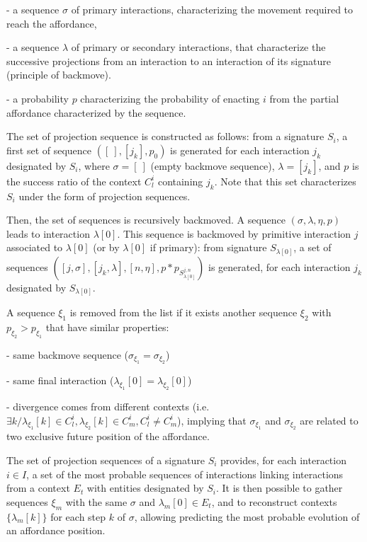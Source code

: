 \documentclass[conference]{IEEEtran}
\begin{document}
- a sequence $\sigma$ of primary interactions, characterizing the movement required to reach the affordance,

- a sequence $\lambda$ of primary or secondary interactions, that characterize the successive projections from an interaction to an interaction of its signature (principle of backmove).

- a probability $p$ characterizing the probability of enacting $i$ from the partial affordance characterized by the sequence.


The set of projection sequence is constructed as follows: from a signature $S_i$, a first set of sequence $([\:], [j_k], p_0)$ is generated for each interaction $j_k$ designated by $S_i$, where $\sigma=[\: ]$ (empty backmove sequence), $\lambda=[j_k]$,
and $p$ is the success ratio of the context $C_l^i$ containing $j_k$. Note that this set characterizes $S_i$ under the form of projection sequences.

Then, the set of sequences is recursively backmoved. A sequence $(\sigma, \lambda, \eta, p)$ leads to interaction $\lambda[0]$. This sequence is backmoved by primitive interaction $j$ associated to $\lambda[0]$ (or by $\lambda[0]$ if primary): from signature $S_{\lambda[0]}$, a set of sequences $([j,\sigma], [j_k,\lambda], [n,\eta], p*p_{S_{\lambda[0]}^{j,n}})$ is generated, for each interaction $j_k$ designated by $S_{\lambda[0]}$.

A sequence $\xi_1$ is removed from the list if it exists another sequence $\xi_2$ with $p_{\xi_2}>p_{\xi_1}$ that have similar properties:

- same backmove sequence ($\sigma_{\xi_1}=\sigma_{\xi_2}$)

- same final interaction ($\lambda_{\xi_1}[0]=\lambda_{\xi_2}[0]$)

- divergence comes from different contexts (i.e. $\exists k / \lambda_{\xi_1}[k] \in C_l^i, \lambda_{\xi_2}[k] \in C_m^i, C_l^i \neq C_m^i$), implying that $\sigma_{\xi_1}$ and $\sigma_{\xi_2}$  are related to two exclusive future position of the affordance. %

The set of projection sequences of a signature $S_i$ provides, for each interaction $i \in I$, a set of the most probable sequences of interactions linking interactions from a context $E_t$ with entities designated by $S_i$.
It is then possible to gather sequences $\xi_m$ with the same $\sigma$ and $\lambda_m[0]\in E_t$, and to reconstruct contexts $\{\lambda_m[k]\}$ for each step $k$ of $\sigma$, allowing  predicting the most probable evolution of an affordance position.
\end{document}
